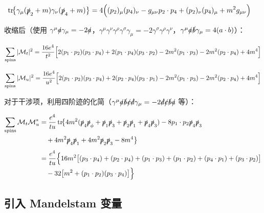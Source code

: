 \begin{align}
    \operatorname{tr}\!\bigl\{\gamma_\mu (\slashed{p}_2 + m)\gamma_\nu (\slashed{p}_4 + m)\bigr\}
    &= 4\Bigl((p_2)_\mu (p_4)_\nu - g_{\mu\nu} p_2 \cdot p_4 + (p_2)_\nu (p_4)_\mu + m^2 g_{\mu\nu}\Bigr)
\end{align}

收缩后（使用 $\gamma^\mu \slashed{a} \gamma_\mu = -2\slashed{a}$，$\gamma^\mu \gamma^\nu \gamma^\rho \gamma^\sigma \gamma_\mu = -2\gamma^\sigma\gamma^\rho\gamma^\nu$，$\gamma^\mu \slashed{a}\slashed{b}\gamma_\mu = 4(a\cdot b)$）：

\begin{equation}
    \sum_{\mathrm{spins}} |\mathcal{M}_t|^2
    = \frac{16e^4}{t^2}
    \Bigl[
    2(p_1 \cdot p_2)(p_3 \cdot p_4) + 2(p_1 \cdot p_4)(p_3 \cdot p_2)
    - 2m^2(p_1 \cdot p_3) - 2m^2(p_2 \cdot p_4) + 4m^4
    \Bigr]
\end{equation}

\begin{equation}
    \sum_{\mathrm{spins}} |\mathcal{M}_u|^2
    = \frac{16e^4}{u^2}
    \Bigl[
    2(p_1 \cdot p_2)(p_3 \cdot p_4) + 2(p_2 \cdot p_4)(p_3 \cdot p_1)
    - 2m^2(p_1 \cdot p_3) - 2m^2(p_2 \cdot p_4) + 4m^4
    \Bigr]
\end{equation}

对于干涉项，利用四阶迹的化简（$\gamma^\mu \slashed{a}\slashed{b}\slashed{c}\slashed{d}\gamma_\mu = -2\slashed{d}\slashed{c}\slashed{b}\slashed{a}$ 等）：

\begin{align}
    \sum_{\mathrm{spins}} \mathcal{M}_t \mathcal{M}_u^* &= \frac{e^4}{tu}
    \operatorname{tr}\!\bigl\{
    4m^2(\slashed{p}_4 \slashed{p}_\phi + \slashed{p}_1\slashed{p}_3 + \slashed{p}_2\slashed{p}_1 + \slashed{p}_4\slashed{p}_3)
    - 8 p_1 \cdot p_2 \slashed{p}_4 \slashed{p}_3 \notag \\
    &\quad + 4m^2 \slashed{p}_4\slashed{p}_1 + 4m^2 \slashed{p}_2\slashed{p}_3 - 8m^4
    \bigr\} \notag \\[4pt]
    &= \frac{e^4}{tu}\Bigl\{
    16m^2\bigl[(p_3 \cdot p_4) + (p_2 \cdot p_4) + (p_1 \cdot p_3) + (p_1 \cdot p_2) + (p_4 \cdot p_1) + (p_3 \cdot p_2)\bigr] \notag\\
    &\quad - 32\bigl[m^2 + (p_1 \cdot p_2)(p_3 \cdot p_4)\bigr]
    \Bigr\}
\end{align}

\subsection*{引入 Mandelstam 变量}

